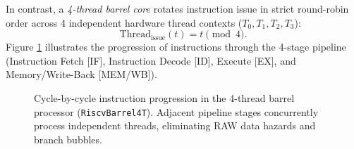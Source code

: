 In contrast, a \textit{4-thread barrel core} rotates instruction issue in strict round-robin order across 4 independent hardware thread contexts ($T_0, T_1, T_2, T_3$):
\begin{equation}
\text{Thread}_{\text{issue}}(t) = t \pmod 4.
\end{equation}
Figure \ref{fig:barrel_pipeline_flow} illustrates the progression of instructions through the 4-stage pipeline (Instruction Fetch [IF], Instruction Decode [ID], Execute [EX], and Memory/Write-Back [MEM/WB]).

\begin{figure}[htbp]
\centering
\footnotesize
\renewcommand{\arraystretch}{1.2}
\caption{Cycle-by-cycle instruction progression in the 4-thread barrel processor (\texttt{RiscvBarrel4T}). Adjacent pipeline stages concurrently process independent threads, eliminating RAW data hazards and branch bubbles.}
\label{fig:barrel_pipeline_flow}
\end{figure}

